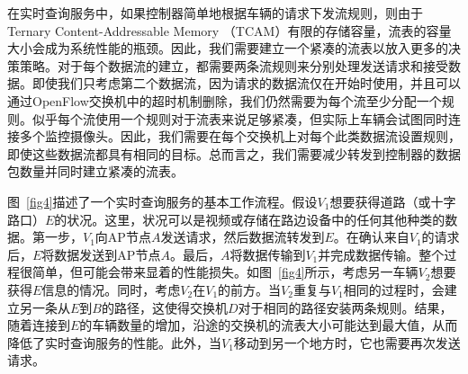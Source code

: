 \documentclass{ctexart}
\begin{document}
在实时查询服务中，如果控制器简单地根据车辆的请求下发流规则，则由于Ternary Content-Addressable Memory （TCAM）有限的存储容量，流表的容量大小会成为系统性能的瓶颈。因此，我们需要建立一个紧凑的流表以放入更多的决策策略。对于每个数据流的建立，都需要两条流规则来分别处理发送请求和接受数据。即使我们只考虑第二个数据流，因为请求的数据流仅在开始时使用，并且可以通过OpenFlow交换机中的超时机制删除，我们仍然需要为每个流至少分配一个规则。似乎每个流使用一个规则对于流表来说足够紧凑，但实际上车辆会试图同时连接多个监控摄像头。因此，我们需要在每个交换机上对每个此类数据流设置规则，即使这些数据流都具有相同的目标。总而言之，我们需要减少转发到控制器的数据包数量并同时建立紧凑的流表。


图~\ref{fig4}描述了一个实时查询服务的基本工作流程。假设$V_{1}$想要获得道路（或十字路口）$E$的状况。这里，状况可以是视频或存储在路边设备中的任何其他种类的数据。第一步，$V_{1}$向AP节点$A$发送请求，然后数据流转发到$E$。在确认来自$V_{1}$的请求后，$E$将数据发送到AP节点$A$。最后，$A$将数据传输到$V_{1}$并完成数据传输。整个过程很简单，但可能会带来显着的性能损失。如图~\ref{fig4}所示，考虑另一车辆$V_{2}$想要获得$E$信息的情况。同时，考虑$V_{2}$在$V_{1}$的前方。当$V_{2}$重复与$V_{1}$相同的过程时，会建立另一条从$E$到$B$的路径，这使得交换机$D$对于相同的路径安装两条规则。结果，随着连接到$E$的车辆数量的增加，沿途的交换机的流表大小可能达到最大值，从而降低了实时查询服务的性能。此外，当$V_{1}$移动到另一个地方时，它也需要再次发送请求。
\end{document}
